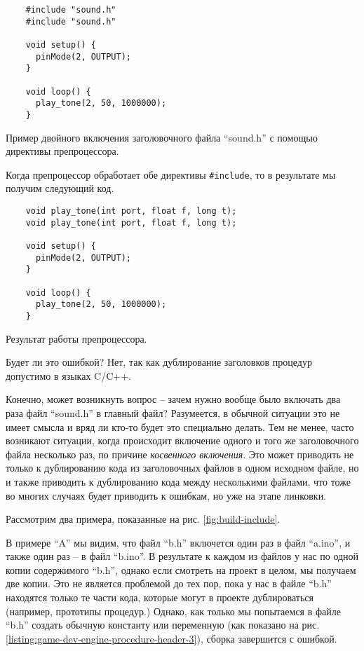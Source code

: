 \documentclass[../sparc.tex]{subfiles}
\begin{document}
\begin{listing}[H]
  \begin{verbatim}
    #include "sound.h"
    #include "sound.h"

    void setup() {
      pinMode(2, OUTPUT);
    }

    void loop() {
      play_tone(2, 50, 1000000);
    }
  \end{verbatim}
  \label{listing:game-dev-engine-procedure-header-include-2}
  \caption{Пример двойного включения заголовочного файла ``sound.h'' с помощью
    директивы препроцессора.}
\end{listing}

Когда препроцессор обработает обе директивы \texttt{#include}, то в
результате мы получим следующий код.

\begin{listing}[H]
  \begin{verbatim}
    void play_tone(int port, float f, long t);
    void play_tone(int port, float f, long t);

    void setup() {
      pinMode(2, OUTPUT);
    }

    void loop() {
      play_tone(2, 50, 1000000);
    }
  \end{verbatim}
  \label{listing:game-dev-engine-procedure-header-include-2}
  \caption{Результат работы препроцессора.}
\end{listing}

Будет ли это ошибкой?  Нет, так как дублирование заголовков процедур допустимо в
языках C/C++.

Конечно, может возникнуть вопрос -- зачем нужно вообще было включать два раза
файл ``sound.h'' в главный файл?  Разумеется, в обычной ситуации это не имеет
смысла и вряд ли кто-то будет это специально делать.  Тем не менее, часто
возникают ситуации, когда происходит включение одного и того же заголовочного
файла несколько раз, по причине \emph{косвенного включения}.  Это может
приводить не только к дублированию кода из заголовочных файлов в одном исходном
файле, но и также приводить к дублированию кода между несколькими файлами, что
тоже во многих случаях будет приводить к ошибкам, но уже на этапе линковки.

Рассмотрим два примера, показанные на рис. \ref{fig:build-include}.


В примере ``A'' мы видим, что файл ``b.h'' включется один раз в файл ``a.ino'',
и также один раз -- в файл ``b.ino''.  В результате к каждом из файлов у нас по
одной копии содержимого ``b.h'', однако если смотреть на проект в целом, мы
получаем две копии.  Это не является проблемой до тех пор, пока у нас в файле
``b.h'' находятся только те части кода, которые могут в проекте дублироваться
(например, прототипы процедур.)  Однако, как только мы попытаемся в файле
``b.h'' создать обычную константу или переменную (как показано на
рис. \ref{listing:game-dev-engine-procedure-header-3}), сборка завершится с
ошибкой.
\end{document}
